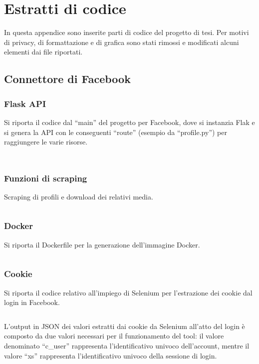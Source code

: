 \appendix 
\chapter{Estratti di codice}\label{appendice}
In questa appendice sono inserite parti di codice del progetto di tesi.
Per motivi di privacy, di formattazione e di grafica sono stati rimossi e modificati alcuni elementi dai file riportati. 
\section{Connettore di Facebook}\label{app:fb_codice}
\subsection{Flask API}\label{flask_code}
Si riporta il codice dal ``main'' del progetto per Facebook, dove si instanzia Flak e si genera la API con le conseguenti ``route'' (esempio da ``profile.py'') per raggiungere le varie risorse. 

\inputminted[bgcolor=bg]{python}{codice/flask_fb.txt}

\inputminted[bgcolor=bg]{python}{codice/flask_route.txt}

\subsection{Funzioni di scraping} \label{scraping_funzioni}
Scraping di profili e download dei relativi media.
\inputminted[bgcolor=bg]{python}{codice/user_posts_fb.txt}
\subsection{Docker}\label{dockerfile}
Si riporta il Dockerfile per la generazione dell'immagine Docker.
\inputminted[bgcolor=bg]{docker}{codice/dockerfile.txt}
\subsection{Cookie} \label{cookie_code}
Si riporta il codice relativo all'impiego di Selenium per l'estrazione dei cookie dal login in Facebook.
\inputminted[bgcolor=bg]{python}{codice/create_cookie.txt}

L'output in JSON dei valori estratti dai cookie da Selenium all'atto del login \`e composto da due valori necessari per il funzionamento del tool: il valore denominato ``c\_user'' rappresenta l'identificativo univoco dell'account, mentre il valore ``xs'' rappresenta l'identificativo univoco della sessione di login.
\inputminted[bgcolor=bg]{json}{codice/cookie_ex.json}

